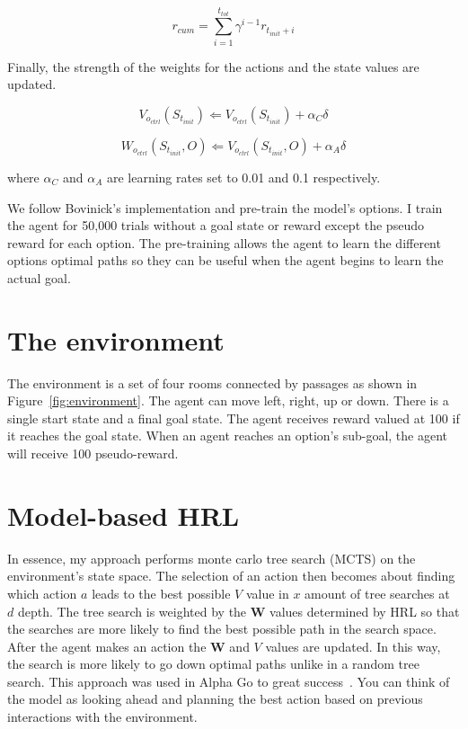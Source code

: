 \begin{equation}r_{cum} = \sum_{i=1}^{t_{tot}} \gamma^{i-1}r_{t_{init}+i}\end{equation}

Finally, the strength of the weights for the actions and the state values are updated.

\begin{equation}V_{o_{ctrl}}(S_{t_{init}}) \Longleftarrow V_{o_{ctrl}}(S_{t_{init}}) + \alpha_{C}\delta\end{equation}

\begin{equation}W_{o_{ctrl}}(S_{t_{init}},O) \Longleftarrow V_{o_{ctrl}}(S_{t_{init}},O) + \alpha_{A}\delta\end{equation}

where $\alpha_{C}$ and $\alpha_{A}$ are learning rates set to 0.01 and 0.1 respectively.

We follow Bovinick's implementation and pre-train the model's options. I train the agent for 50,000 trials without a goal state or reward except the pseudo reward for each option. The pre-training allows the agent to learn the different options optimal paths so they can be useful when the agent begins to learn the actual goal.

\section{The environment}
The environment is a set of four rooms connected by passages as shown in Figure~\ref{fig:environment}. The agent can move left, right, up or down. There is a single start state and a final goal state. The agent receives reward valued at 100 if it reaches the goal state. When an agent reaches an option's sub-goal, the agent will receive 100 pseudo-reward.



\section{Model-based HRL}

In essence, my approach performs monte carlo tree search (MCTS) on the environment's state space. The selection of an action then becomes about finding which action $a$ leads to the best possible $V$ value in $x$ amount of tree searches at $d$ depth. The tree search is weighted by the \textbf{W} values determined by HRL so that the searches are more likely to find the best possible path in the search space. After the agent makes an action the \textbf{W} and $V$ values are updated. In this way, the search is more likely to go down optimal paths unlike in a random tree search. This approach was used in Alpha Go to great success~\cite{silver2016mastering}. You can think of the model as looking ahead and planning the best action based on previous interactions with the environment.

